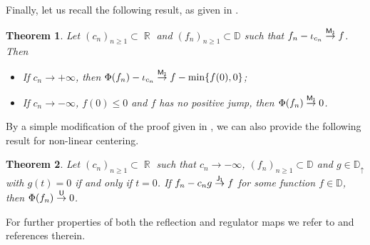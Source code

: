 \documentclass[]{amsart}
\numberwithin{equation}{section}
\newtheorem{thm}{Theorem}[section]
\theoremstyle{remark}
\theoremstyle{definition}
\DeclareMathOperator{\R}{\mathbb{R}}
\begin{document}
Finally, let us recall the following result, as given in \cite[Theorem 13.5.2]{whitt2002stochastic}.
\begin{thm}\label{thm:contcent}
	Let $(c_n)_{n \ge 1}\subset \R$ and $(f_n)_{n \ge 1} \subset \mathbb{D}$ such that $f_n-\iota_{c_n} \overset{\sf M_1}{\to} f$. Then
	\begin{itemize}
		\item[$(i)$] If $c_n \to +\infty$, then $\Phi(f_n)-\iota_{c_n} \overset{\sf M_1}{\to} f-\min\{f(0),0\}$;
		\item[$(ii)$] If $c_n \to -\infty$, $f(0) \le 0$ and $f$ has no positive jump, then $\Phi(f_n) \overset{\sf M_1}{\to} 0$.
	\end{itemize}
\end{thm}
By a simple modification of the proof given in \cite[Theorem 6.2, Item $(ii)$]{whitt1980some}, we can also provide the following result for non-linear centering.
\begin{thm}\label{thm:contcent2}
	Let $(c_n)_{n \ge 1}\subset \R$ such that $c_n \to -\infty$, $(f_n)_{n \ge 1} \subset \mathbb{D}$ and $g \in \mathbb{D}_{\uparrow}$ with $g(t)=0$ if and only if $t=0$. If $f_n-c_ng \overset{\sf J_1}{\to} f$ for some function $f \in \mathbb{D}$, then $\Phi(f_n) \overset{\sf U}{\to} 0$.
\end{thm}
For further properties of both the reflection and regulator maps we refer to \cite{whitt2002stochastic} and references therein.
\end{document}

